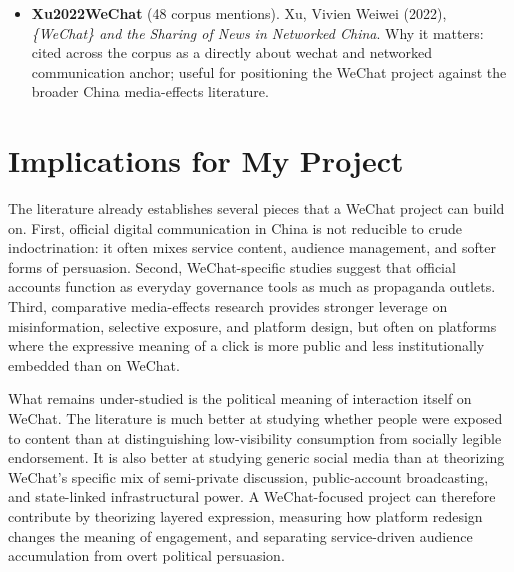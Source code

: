 \documentclass[12pt]{article}
\begin{document}
\begin{itemize}[leftmargin=1.5em]
\item \textbf{Xu2022WeChat} (48 corpus mentions). Xu, Vivien Weiwei (2022), \emph{\{WeChat\} and the Sharing of News in Networked China}. Why it matters: cited across the corpus as a directly about wechat and networked communication anchor; useful for positioning the WeChat project against the broader China media-effects literature.
        \end{itemize}

        \section{Implications for My Project}

        The literature already establishes several pieces that a WeChat project can build on. First, official digital communication in China is not reducible to crude indoctrination: it often mixes service content, audience management, and softer forms of persuasion. Second, WeChat-specific studies suggest that official accounts function as everyday governance tools as much as propaganda outlets. Third, comparative media-effects research provides stronger leverage on misinformation, selective exposure, and platform design, but often on platforms where the expressive meaning of a click is more public and less institutionally embedded than on WeChat.

        What remains under-studied is the political meaning of interaction itself on WeChat. The literature is much better at studying whether people were exposed to content than at distinguishing low-visibility consumption from socially legible endorsement. It is also better at studying generic social media than at theorizing WeChat's specific mix of semi-private discussion, public-account broadcasting, and state-linked infrastructural power. A WeChat-focused project can therefore contribute by theorizing layered expression, measuring how platform redesign changes the meaning of engagement, and separating service-driven audience accumulation from overt political persuasion.

        
        
        
\end{document}
